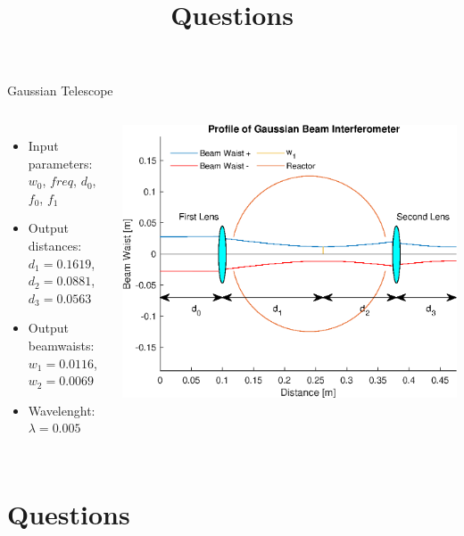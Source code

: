 \documentclass[hyperref={colorlinks=true,urlcolor=blue,linkcolor=.},aspectratio=1610,mathserif]{beamer}
\begin{document}
\begin{frame}{Gaussian Telescope}
	\begin{columns}
		\begin{itemize}
			\item Input parameters:\\
			\(w_0\), \(freq\), \(d_0\), \(f_0\), \(f_1\)
			\item Output distances:\\
			\(d_1 = 0.1619\), \(d_2 = 0.0881\), \(d_3 = 0.0563\)
			\item Output beamwaists:\\
			\(w_1 = 0.0116\), \(w_2 = 0.0069\)
			\item Wavelenght: \(\lambda=0.005\)
		\end{itemize}
		\includegraphics[width=\textwidth]{MatlabFigures/Interferometer/Interferometer.eps}
	\end{columns}
\end{frame}
\section*{Questions}
\title{Questions}
\subtitle{}
\begin{frame}
	\titlepage
\end{frame}
\end{document}
